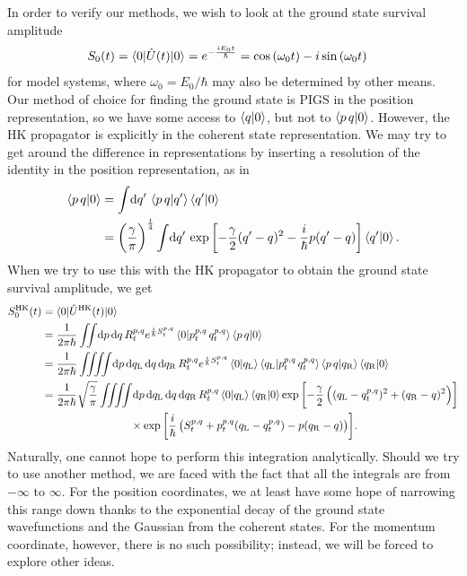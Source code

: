 In order to verify our methods, we wish to look at the ground state survival amplitude
\begin{align}
	S_0(t)
	&= \braket{0 | \hat{U}(t) | 0}
	= e^{-\frac{i E_0 t}{\hbar}}
	= \cos{(\omega_0 t)} - i \sin{(\omega_0 t)}
\end{align}
for model systems, where $\omega_0 = E_0 / \hbar$ may also be determined by other means.
Our method of choice for finding the ground state is PIGS in the position representation, so we have some access to $\braket{q | 0}$, but not to $\braket{p \, q | 0}$.
However, the HK propagator is explicitly in the coherent state representation.
We may try to get around the difference in representations by inserting a resolution of the identity in the position representation, as in
\begin{subequations}
\begin{align}
	\braket{p \, q | 0}
	&= \int\! \dif q' \, \braket{p \, q | q'} \braket{q' | 0} \\
	&= \left( \frac{\gamma}{\pi} \right)^\frac{1}{4} \int\! \dif q' \, \expb{-\frac{\gamma}{2} (q' - q)^2 - \frac{i}{\hbar} p (q' - q)} \braket{q' | 0}.
\end{align}
\end{subequations}
When we try to use this with the HK propagator to obtain the ground state survival amplitude, we get
\begin{subequations}
\begin{align}
	S_0\hk(t)
	&= \braket{0 | \hat{U}\hk(t) | 0} \\
	&= \frac{1}{2 \pi \hbar} \iint\! \dif p \dif q \,
			R\coh{p}{q}_t e^{\frac{i}{\hbar} S\coh{p}{q}_t}
			\braket{0 | p\coh{p}{q}_t \, q\coh{p}{q}_t} \braket{p \, q | 0} \\
	&= \frac{1}{2 \pi \hbar} \iiiint\! \dif p \dif q\LLup \dif q \dif q\RRup \,
			R\coh{p}{q}_t e^{\frac{i}{\hbar} S\coh{p}{q}_t}
			\braket{0 | q\LLup} \braket{q\LLup | p\coh{p}{q}_t \, q\coh{p}{q}_t}
			\braket{p \, q | q\RRup} \braket{q\RRup | 0} \\
	&= \frac{1}{2 \pi \hbar} \sqrt{\frac{\gamma}{\pi}} \iiiint\! \dif p \dif q\LLup \dif q \dif q\RRup \,
			R\coh{p}{q}_t \braket{0 | q\LLup} \braket{q\RRup | 0}
			\expb{-\frac{\gamma}{2} \left( (q\LLup - q\coh{p}{q}_t)^2 + (q\RRup - q)^2 \right)} \notag \\
	&\qquad\qquad\qquad\qquad\times
			\expb{\frac{i}{\hbar} \left( S\coh{p}{q}_t + p\coh{p}{q}_t (q\LLup - q\coh{p}{q}_t) - p (q\RRup - q) \right)}.
				\label{eq:survival-hk}
\end{align}
\end{subequations}
Naturally, one cannot hope to perform this integration analytically.
Should we try to use another method, we are faced with the fact that all the integrals are from $-\infty$ to $\infty$.
For the position coordinates, we at least have some hope of narrowing this range down thanks to the exponential decay of the ground state wavefunctions and the Gaussian from the coherent states.
For the momentum coordinate, however, there is no such possibility; instead, we will be forced to explore other ideas.




